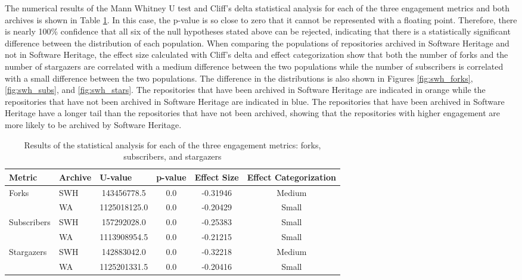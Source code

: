 The numerical results of the Mann Whitney U test and Cliff's delta statistical analysis for each of the three engagement metrics and both archives is shown in Table \ref{tab:stat_analysis}. In this case, the p-value is so close to zero that it cannot be represented with a floating point. Therefore, there is nearly 100\% confidence that all six of the null hypotheses stated above can be rejected, indicating that there is a statistically significant difference between the distribution of each population. When comparing the populations of repositories archived in Software Heritage and not in Software Heritage, the effect size calculated with Cliff's delta and effect categorization show that both the number of forks and the number of stargazers are correlated with a medium difference between the two populations while the number of subscribers is correlated with a small difference between the two populations. The difference in the distributions is also shown in Figures \ref{fig:swh_forks}, \ref{fig:swh_subs}, and \ref{fig:swh_stars}. The repositories that have been archived in Software Heritage are indicated in orange while the repositories that have not been archived in Software Heritage are indicated in blue. The repositories that have been archived in Software Heritage have a longer tail than the repositories that have not been archived, showing that the repositories with higher engagement are more likely to be archived by Software Heritage. 

\begin{table}[]
    \centering
    \begin{tabular}{|l|l|c|c|c|c|}
        \hline
        Metric & Archive & \multicolumn{1}{l|}{U-value} & \multicolumn{1}{l|}{p-value} & \multicolumn{1}{l|}{Effect Size} & \multicolumn{1}{l|}{Effect Categorization} \\ \hline
        \multirow{2}{*}{Forks} & SWH & 143456778.5 & 0.0 & -0.31946 & Medium \\ \cline{2-6} 
         & WA & 1125018125.0 & 0.0 & -0.20429 & Small \\ \hline
        \multirow{2}{*}{Subscribers} & SWH & 157292028.0 & 0.0 & -0.25383 & Small \\ \cline{2-6} 
         & WA & 1113908954.5 & 0.0 & -0.21215 & Small \\ \hline
        \multirow{2}{*}{Stargazers} & SWH & 142883042.0 & 0.0 & -0.32218 & Medium \\ \cline{2-6} 
         & WA & 1125201331.5 & 0.0 & -0.20416 & Small \\ \hline
    \end{tabular}
\caption{Results of the statistical analysis for each of the three engagement metrics: forks, subscribers, and stargazers}
\label{tab:stat_analysis}
\end{table}

